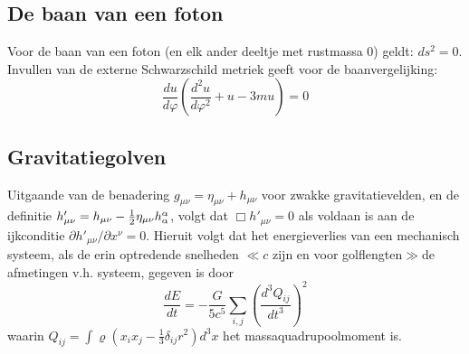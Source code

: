 \documentclass[twoside]{report}
\begin{document}
\subsection{De baan van een foton}
Voor de baan van een foton (en elk ander deeltje met rustmassa 0) geldt:
$ds^2=0$. Invullen van de externe Schwarzschild metriek geeft voor de
baanvergelijking:
\[
\frac{du}{d\varphi}\left(\frac{d^2u}{d\varphi^2}+u-3mu\right)=0
\]

\subsection{Gravitatiegolven}
Uitgaande van de benadering $g_{\mu\nu}=\eta_{\mu\nu}+h_{\mu\nu}$ voor zwakke
gravitatievelden, en de definitie $h'_{\mu\nu}=h_{\mu\nu}-\mbox{$\frac{1}{2}$}\eta_{\mu\nu}h^{\alpha}_{\alpha}$,
volgt dat $\Box h'_{\mu\nu}=0$ als voldaan is aan de ijkconditie
$\partial h'_{\mu\nu}/\partial x^\nu=0$. Hieruit volgt dat het energieverlies
van een mechanisch systeem, als de erin optredende snelheden $\ll c$ zijn en
voor golflengten$\gg$de afmetingen v.h. systeem, gegeven is door
\[
\frac{dE}{dt}=-\frac{G}{5c^5}\sum_{i,j}\left(\frac{d^3Q_{ij}}{dt^3}\right)^2
\]
waarin $Q_{ij}=\int\varrho(x_ix_j-\frac{1}{3}\delta_{ij}r^2)d^3x$ het
massaquadrupoolmoment is.
\end{document}
